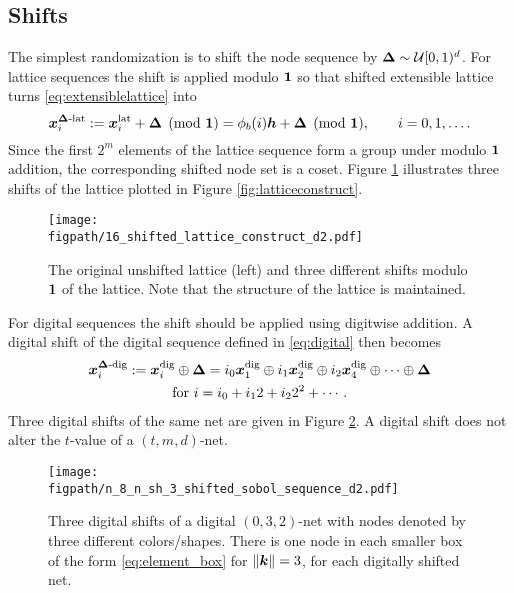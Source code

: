 \documentclass{svproc}
\newcommand{\figpath}{Figures}
\begin{document}
\subsection{Shifts} \label{sec:shifts}
The simplest randomization is to shift the node sequence by ${\boldsymbol{\Delta}}  \sim {\mathcal{U}}[0,1)^d$.  For lattice  sequences the shift is applied modulo ${\boldsymbol{1}}$ so that shifted extensible lattice turns
\eqref{eq:extensiblelattice} into
\begin{equation} \label{eq:sh_extensiblelattice}
	{\boldsymbol{x}}^{{\boldsymbol{\Delta}}\text{-lat}}_i := {\boldsymbol{x}}_i^{\text{lat}} + {\boldsymbol{\Delta}} \pmod {{\boldsymbol{1}}} =\phi_b( i){\boldsymbol{h}} + {\boldsymbol{\Delta}} \pmod {{\boldsymbol{1}}}, \qquad i = 0, 1 , \ldots.
\end{equation}
Since the first $2^m$ elements of the lattice sequence form a group under modulo ${\boldsymbol{1}}$ addition, the corresponding shifted node set is a coset.  Figure \ref{fig:shift_lat} illustrates three shifts of the lattice plotted in Figure \ref{fig:latticeconstruct}.

\begin{figure}
	\centering
	\texttt{[image: \\figpath/16\_shifted\_lattice\_construct\_d2.pdf]}
	\caption{The original unshifted lattice (left) and three different shifts modulo ${\boldsymbol{1}}$ of the lattice.  Note that the structure of the lattice is maintained. \label{fig:shift_lat}}
\end{figure}

For digital sequences the shift should be applied using digitwise addition.  A digital shift of the digital sequence defined in  \eqref{eq:digital} then becomes
\begin{multline} \label{eq:sh_digital}
	{\boldsymbol{x}}_i^{{\boldsymbol{\Delta}}\text{-dig}} := {\boldsymbol{x}}_i^{\text{dig}} \oplus {\boldsymbol{\Delta}} = i_0 {\boldsymbol{x}}^{\text{dig}}_1 \oplus i_1 {\boldsymbol{x}}^{\text{dig}}_2 \oplus i_2 {\boldsymbol{x}}^{\text{dig}}_4 \oplus \cdots \oplus {\boldsymbol{\Delta}} \\
    \text{for }
	i = i_0 + i_12 + i_2 2^2 + \cdots.
\end{multline}
Three digital shifts of the same net are given in Figure \ref{fig:shift_net}.  A digital shift does not alter the $t$-value of a $(t,m,d)$-net.

\begin{figure}
	\centering
	\texttt{[image: \\figpath/n\_8\_n\_sh\_3\_shifted\_sobol\_sequence\_d2.pdf]}
	\caption{Three digital shifts of a digital $(0,3,2)$-net with nodes denoted by three different colors/shapes.  There is one node in each smaller box of the form \eqref{eq:element_box} for $\lVert {\boldsymbol{k}} \rVert = 3$, for each digitally shifted net. \label{fig:shift_net}}
\end{figure}
\end{document}
